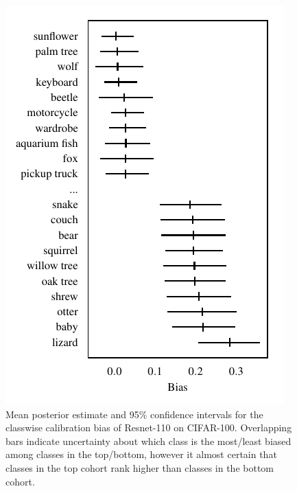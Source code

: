 \documentclass{article}
\begin{document}
\begin{figure}[t]
    \centering
    \includegraphics{figures/cifar100_bias.pdf}
    \caption{
        Mean posterior estimate and 95\% confidence intervals for the classwise calibration bias of Resnet-110 on CIFAR-100.
        Overlapping bars indicate uncertainty about which class is the most/least biased among classes in the top/bottom, however it almost certain that classes in the top cohort rank higher than classes in the bottom cohort.
    }
    \label{fig:cifar_bias}
\end{figure}
\end{document}
